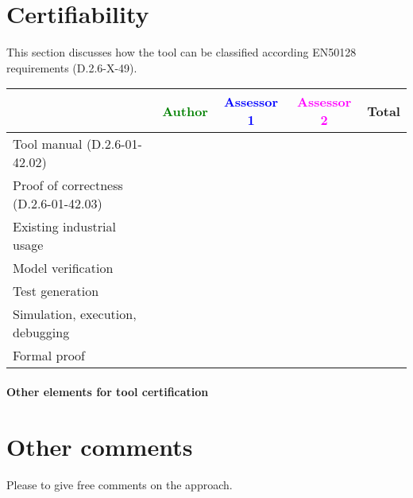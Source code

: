 \section{Certifiability}

This section discusses how the tool can be classified according EN50128 requirements (D.2.6-X-49).


\begin{tabular}{|l | c | c | c | c|}
\hline
& \textcolor{green}{Author} & \textcolor{blue}{Assessor 1} & \textcolor{magenta}{Assessor 2} & Total \\
\hline 
Tool manual (D.2.6-01-42.02) & & & &  \\
\hline
Proof of correctness (D.2.6-01-42.03)   & & & & \\
\hline
Existing industrial  usage  & & & & \\
\hline
Model verification & & & & \\
\hline
Test generation & & & & \\
\hline
Simulation, execution, debugging & & & & \\
\hline
Formal proof & & & & \\
\hline
\end{tabular}

\paragraph{Other elements for tool certification}

\section{Other comments}
Please to  give free comments on the approach.

